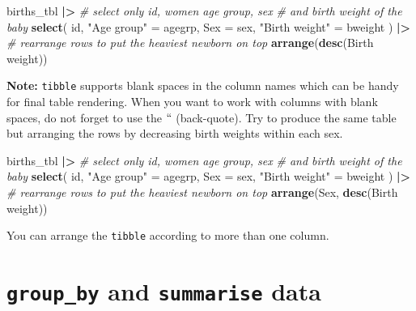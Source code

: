 \documentclass[
]{book}
\newenvironment{Shaded}{\begin{snugshade}}{\end{snugshade}}
\newcommand{\AttributeTok}[1]{\textcolor[rgb]{0.13,0.29,0.53}{#1}}
\newcommand{\CommentTok}[1]{\textcolor[rgb]{0.56,0.35,0.01}{\textit{#1}}}
\newcommand{\FunctionTok}[1]{\textcolor[rgb]{0.13,0.29,0.53}{\textbf{#1}}}
\newcommand{\NormalTok}[1]{#1}
\newcommand{\OtherTok}[1]{\textcolor[rgb]{0.56,0.35,0.01}{#1}}
\newcommand{\SpecialCharTok}[1]{\textcolor[rgb]{0.81,0.36,0.00}{\textbf{#1}}}
\newcommand{\StringTok}[1]{\textcolor[rgb]{0.31,0.60,0.02}{#1}}
\begin{document}
\begin{Shaded}
\begin{Highlighting}[]
\NormalTok{births\_tbl }\SpecialCharTok{|\textgreater{}}
  \CommentTok{\# select only id, women age group, sex }
  \CommentTok{\# and birth weight of the baby}
  \FunctionTok{select}\NormalTok{(}
\NormalTok{    id,}
    \StringTok{"Age group"} \OtherTok{=}\NormalTok{ agegrp,}
    \AttributeTok{Sex =}\NormalTok{ sex,}
    \StringTok{"Birth weight"} \OtherTok{=}\NormalTok{ bweight}
\NormalTok{  ) }\SpecialCharTok{|\textgreater{}}
  \CommentTok{\# rearrange rows to put the heaviest newborn on top}
  \FunctionTok{arrange}\NormalTok{(}\FunctionTok{desc}\NormalTok{(}\StringTok{\textasciigrave{}}\AttributeTok{Birth weight}\StringTok{\textasciigrave{}}\NormalTok{))}
\end{Highlighting}
\end{Shaded}

\textbf{Note:} \texttt{tibble} supports blank spaces in the column names which can be handy for final table
rendering. When you want to work with columns with blank spaces, do not forget to use the \(``\)
(back-quote).
Try to produce the same table but arranging the rows by decreasing birth weights within each sex.

\begin{Shaded}
\begin{Highlighting}[]
\NormalTok{births\_tbl }\SpecialCharTok{|\textgreater{}}
  \CommentTok{\# select only id, women age group, sex }
  \CommentTok{\# and birth weight of the baby}
  \FunctionTok{select}\NormalTok{(}
\NormalTok{    id,}
    \StringTok{"Age group"} \OtherTok{=}\NormalTok{ agegrp,}
    \AttributeTok{Sex =}\NormalTok{ sex,}
    \StringTok{"Birth weight"} \OtherTok{=}\NormalTok{ bweight}
\NormalTok{  ) }\SpecialCharTok{|\textgreater{}}
  \CommentTok{\# rearrange rows to put the heaviest newborn on top}
  \FunctionTok{arrange}\NormalTok{(Sex, }\FunctionTok{desc}\NormalTok{(}\StringTok{\textasciigrave{}}\AttributeTok{Birth weight}\StringTok{\textasciigrave{}}\NormalTok{))}
\end{Highlighting}
\end{Shaded}

You can arrange the \texttt{tibble} according to more than one column.

\section{\texorpdfstring{\texttt{group\_by} and \texttt{summarise} data}{group\_by and summarise data}}\label{group_by-and-summarise-data}
\end{document}
